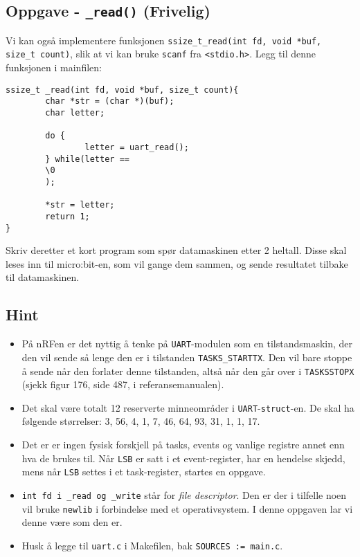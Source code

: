 \cprotect\subsection{Oppgave - \lstinline{_read()} (Frivelig)}

Vi kan også implementere funksjonen \lstinline{ssize_t_read(int fd, void *buf, size_t count)}, slik at vi kan bruke \verb|scanf| fra \verb|<stdio.h>|. Legg til denne funksjonen i mainfilen:


\begin{lstlisting}
ssize_t _read(int fd, void *buf, size_t count){
        char *str = (char *)(buf);
        char letter;
        
        do {
                letter = uart_read();
        } while(letter == 
        \0
        );
        
        *str = letter;
        return 1;
}
\end{lstlisting}

Skriv deretter et kort program som spør datamaskinen etter 2 heltall. Disse
skal leses inn til micro:bit-en, som vil gange dem sammen, og sende resultatet
tilbake til datamaskinen.

\subsection{Hint}\label{subsec:UART-hint}

\begin{itemize}
    \item På nRFen er det nyttig å tenke på \verb|UART|-modulen som en tilstandsmaskin, der den vil sende så lenge den er i tilstanden \verb|TASKS_STARTTX|. Den vil bare stoppe å sende når den forlater denne tilstanden, altså når den går over i \verb|TASKSSTOPX| (sjekk figur 176, side 487, i referansemanualen).
    \item Det skal være totalt 12 reserverte minneområder i \verb|UART|-\verb|struct|-en. De skal ha følgende størrelser: 3, 56, 4, 1, 7, 46, 64, 93, 31, 1, 1, 17.
    \item Det er er ingen fysisk forskjell på tasks, events og vanlige registre annet enn hva de brukes til. Når \verb|LSB| er satt i et event-register, har en hendelse skjedd, mens når \verb|LSB| settes i et task-register, startes en oppgave.
    \item \lstinline{int fd i _read og _write} står for \textit{file descriptor}. Den er der i tilfelle noen vil bruke \verb|newlib| i forbindelse med et operativsystem. I denne oppgaven lar vi denne være som den er.
    \item Husk å legge til \verb|uart.c| i Makefilen, bak \verb|SOURCES := main.c|.
\end{itemize}






